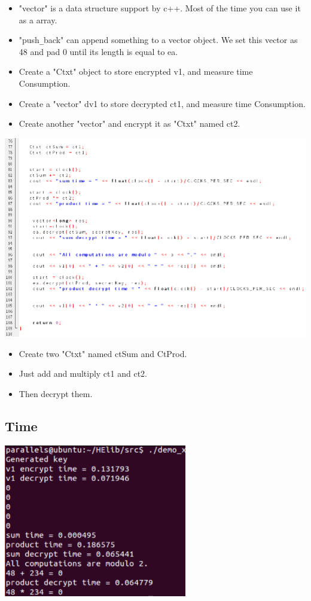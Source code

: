 \documentclass{article}
\begin{document}
\begin{itemize}
\item "vector" is a data structure support by c++. Most of the time you can use it as a array.
\item "push\verb|_|back" can append something to a vector object. We set this vector as 48 and pad 0 until its length is equal to ea.
\item Create a "Ctxt" object to store encrypted v1, and measure time Consumption.
\item Create a "vector" dv1 to store decrypted ct1, and measure time Consumption.
\item Create another "vector" and encrypt it as "Ctxt" named ct2. 
\end{itemize}
\centerline{\includegraphics[width=1\textwidth]{HElibcode3.png}}
\begin{itemize}
\item Create two "Ctxt" named ctSum and CtProd.
\item Just add and multiply ct1 and ct2.
\item Then decrypt them.
\end{itemize}

\subsection{Time}
\centerline{\includegraphics[width=0.6\textwidth]{HElibtime.png}}
 
\end{document}
